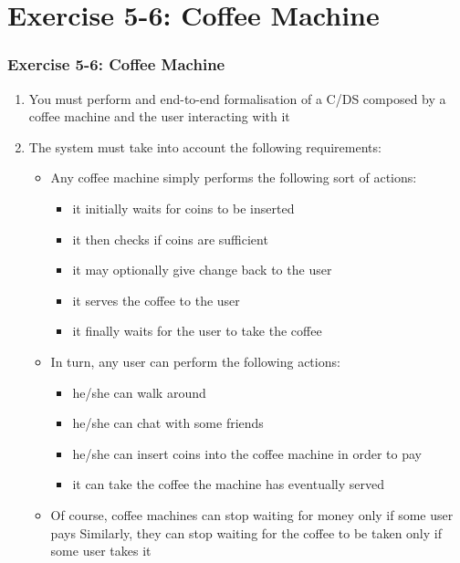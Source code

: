 \documentclass[handout]{beamer}\mode<presentation>{\usetheme{AMSCesenaBleu}}
\begin{document}
\section{Exercise 5-6: Coffee Machine}

\begin{frame}[allowframebreaks]
\frametitle{Exercise 5-6: Coffee Machine}
    
    \begin{enumerate}
        \item You must perform and end-to-end formalisation of a C/DS composed by a coffee machine and the user interacting with it
        
        \item The system must take into account the following requirements:
        \begin{itemize}
            
            \item Any coffee machine simply performs the following sort of actions:
            \begin{itemize}
                \item it initially \alert{waits} for \alert{coins} to be inserted
                \item it then \alert{checks} if coins are sufficient
                \item it may optionally give \alert{change} back to the user
                \item it serves the \alert{coffee} to the user
                \item it finally \alert{waits} for the \alert{user} to take the coffee 
            \end{itemize}
            
            \item In turn, any user can perform the following actions:
            \begin{itemize}
                \item he/she can \alert{walk} around
                \item he/she can \alert{chat} with some friends
                \item he/she can insert coins into the coffee machine in order to \alert{pay}
                \item it can \alert{take} the coffee the machine has eventually served
            \end{itemize}
            
            \item Of course, coffee machines can stop waiting for money only if some user pays 
            Similarly, they can stop waiting for the coffee to be taken only if some user takes it
        \end{itemize}
        

\end{enumerate}
\end{frame}
\end{document}

